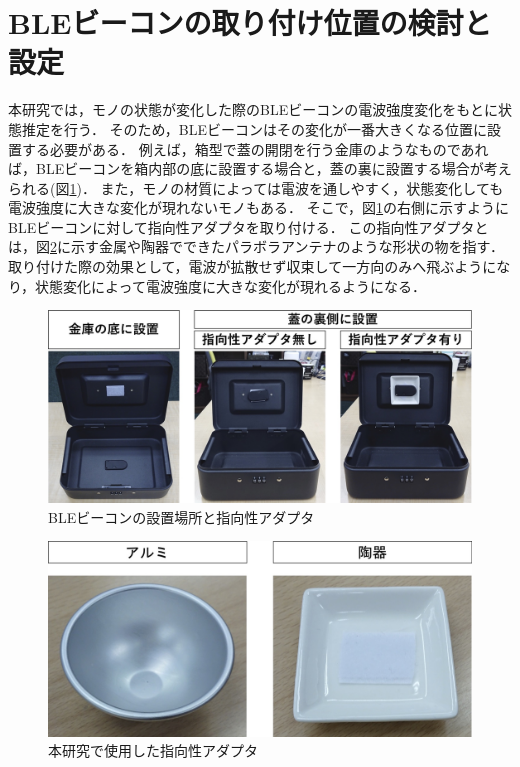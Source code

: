 \section{BLEビーコンの取り付け位置の検討と設定}
本研究では，モノの状態が変化した際のBLEビーコンの電波強度変化をもとに状態推定を行う．
そのため，BLEビーコンはその変化が一番大きくなる位置に設置する必要がある．
例えば，箱型で蓋の開閉を行う金庫のようなものであれば，BLEビーコンを箱内部の底に設置する場合と，蓋の裏に設置する場合が考えられる(図\ref{adapter})．
また，モノの材質によっては電波を通しやすく，状態変化しても電波強度に大きな変化が現れないモノもある．
そこで，図\ref{adapter}の右側に示すようにBLEビーコンに対して指向性アダプタを取り付ける．
この指向性アダプタとは，図\ref{adapter_only}に示す金属や陶器でできたパラボラアンテナのような形状の物を指す．
取り付けた際の効果として，電波が拡散せず収束して一方向のみへ飛ぶようになり，状態変化によって電波強度に大きな変化が現れるようになる．


\begin{figure}[H]
    \centering
    \includegraphics[width=12cm]{images/chapter3/adapta_compare.jpg}
    \caption{BLEビーコンの設置場所と指向性アダプタ}
    \label{adapter}
\end{figure}


\begin{figure}[H]
    \centering
    \includegraphics[width=12cm]{images/chapter3/adapta.jpg}
    \caption{本研究で使用した指向性アダプタ}
    \label{adapter_only}
\end{figure}


